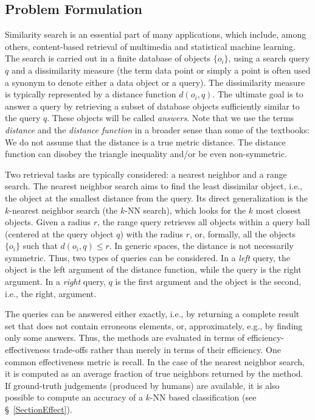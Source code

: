 \documentclass[runningheads,a4paper]{llncs}
\newcommand{\knn}{$k$-NN }
\begin{document}
{\subsection{Problem Formulation}
Similarity search is an essential part of many applications,
which include, among others,  
content-based retrieval of multimedia  and statistical machine learning.
The search is carried out in a finite database of objects $\{o_i\}$,
using a search query $q$ and a dissimilarity measure (the term data point or simply a point is often
used a synonym to denote either a data object or a query).
The dissimilarity measure is typically represented by a distance function $d(o_i, q)$. 
The ultimate goal is to answer a query by retrieving a subset of database objects sufficiently similar to the query $q$.
These objects will be called \emph{answers}.
Note that we use the terms \emph{distance} and the \emph{distance function} in a broader sense than
some of the textbooks:
We do not assume that the distance is a true metric distance. 
The distance function can disobey the triangle inequality and/or be even non-symmetric.

Two retrieval tasks are typically considered: a nearest neighbor and a range search. 
The nearest neighbor search aims to find the least dissimilar object,
i.e., the object at the smallest distance from the query.
Its direct generalization is the $k$-nearest neighbor search (the \knn search),
which looks for the $k$ most closest objects.
Given a radius $r$, 
the range query retrieves all objects within a query ball (centered at the query object $q$) with the radius $r$,
or, formally, all the objects~$\lbrace o_i \rbrace$ such that $d(o_i, q) \le r$. 
In generic spaces, the distance is not necessarily symmetric. 
Thus, two types of queries can be considered. 
In a  \emph{left} query, the object is the left argument of the distance function,
while the query is the right argument.
In a \emph{right} query, $q$ is the first argument and the object is the second, i.e.,
the right, argument.

The queries can be answered either exactly, 
i.e., by returning a complete result set that does not contain erroneous elements, or, 
approximately, e.g., by finding only some answers.
Thus, the methods are evaluated in terms of efficiency-effectiveness trade-offs
rather than merely in terms of their efficiency.
One common effectiveness metric is recall. In the case
of the nearest neighbor search, it is computed as
an average fraction of true neighbors returned by the method.
If ground-truth judgements (produced by humans) are available,
it is also possible to compute an accuracy of a \knn based classification
(see \S~\ref{SectionEffect}).

}
\end{document}
